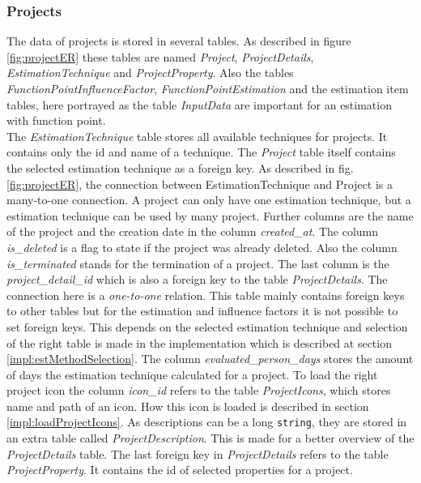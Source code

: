 \subsubsection{Projects}

The data of projects is stored in several tables. As described in figure \ref{fig:projectER} these tables are named \textit{Project}, \textit{ProjectDetails}, \textit{EstimationTechnique} and \textit{ProjectProperty}. Also the tables \textit{FunctionPointInfluenceFactor}, \textit{FunctionPointEstimation} and the estimation item tables, here portrayed as the table \textit{InputData} are important for an estimation with function point.\\
The \textit{EstimationTechnique} table stores all available techniques for projects. It contains only the id and name of a technique. The \textit{Project} table itself contains the selected estimation technique as a foreign key. As described in fig. \ref{fig:projectER}, the connection between EstimationTechnique and Project is a many-to-one connection. A project can only have one estimation technique, but a estimation technique can be used by many project. Further columns are the name of the project and the creation date in the column \textit{created\_at}. The column \textit{is\_deleted} is a flag to state if the project was already deleted. Also the column \textit{is\_terminated} stands for the termination of a project. The last column is the \textit{project\_detail\_id} which is also a foreign key to the table \textit{ProjectDetails}. The connection here is a \textit{one-to-one} relation. This table mainly contains foreign keys to other tables but for the estimation and influence factors it is not possible to set foreign keys. This depends on the selected estimation technique and selection of the right table is made in the implementation which is described at section \ref{impl:estMethodSelection}. The column \textit{evaluated\_person\_days} stores the amount of days the estimation technique calculated for a project. To load the right project icon the column \textit{icon\_id} refers to the table \textit{ProjectIcons}, which stores name and path of an icon. How this icon is loaded is described in section \ref{impl:loadProjectIcons}. As descriptions can be a long \texttt{string}, they are stored in an extra table called \textit{ProjectDescription}. This is made for a better overview of the \textit{ProjectDetails} table. The last foreign key in \textit{ProjectDetails} refers to the table \textit{ProjectProperty}. It contains the id of selected properties for a project.\\
